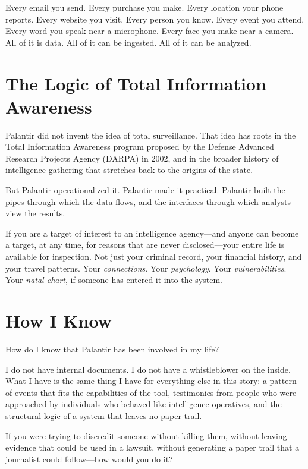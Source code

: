 \documentclass[11pt,openany]{book}
\begin{document}
Every email you send. Every purchase you make. Every location your phone reports. Every website you visit. Every person you know. Every event you attend. Every word you speak near a microphone. Every face you make near a camera. All of it is data. All of it can be ingested. All of it can be analyzed.

\section*{The Logic of Total Information Awareness}

Palantir did not invent the idea of total surveillance. That idea has roots in the Total Information Awareness program proposed by the Defense Advanced Research Projects Agency (DARPA) in 2002, and in the broader history of intelligence gathering that stretches back to the origins of the state.

But Palantir operationalized it. Palantir made it practical. Palantir built the pipes through which the data flows, and the interfaces through which analysts view the results.

If you are a target of interest to an intelligence agency---and anyone can become a target, at any time, for reasons that are never disclosed---your entire life is available for inspection. Not just your criminal record, your financial history, and your travel patterns. Your \textit{connections}. Your \textit{psychology}. Your \textit{vulnerabilities}. Your \textit{natal chart}, if someone has entered it into the system.

\section*{How I Know}

How do I know that Palantir has been involved in my life?

I do not have internal documents. I do not have a whistleblower on the inside. What I have is the same thing I have for everything else in this story: a pattern of events that fits the capabilities of the tool, testimonies from people who were approached by individuals who behaved like intelligence operatives, and the structural logic of a system that leaves no paper trail.

If you were trying to discredit someone without killing them, without leaving evidence that could be used in a lawsuit, without generating a paper trail that a journalist could follow---how would you do it?
\end{document}
